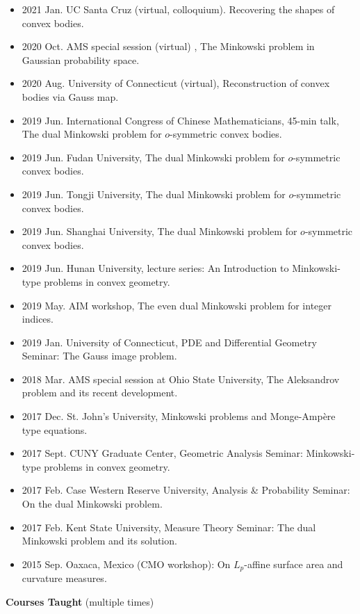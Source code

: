 \documentclass[12pt]{article}
\theoremstyle{plain} \numberwithin{equation}{section}
\theoremstyle{definition}
\begin{document}
\begin{itemize}
\item 2021 Jan. UC Santa Cruz (virtual, colloquium). Recovering the shapes of convex bodies.
\item 2020 Oct.  AMS special session (virtual)
, The Minkowski problem in Gaussian probability space.
\item 2020 Aug. University of Connecticut (virtual), Reconstruction of convex bodies via Gauss map.
\item 2019 Jun. International Congress of Chinese Mathematicians, 45-min talk, The dual Minkowski problem for $o$-symmetric convex bodies.
\item 2019 Jun. Fudan University, The dual Minkowski problem for $o$-symmetric convex bodies.
\item 2019 Jun. Tongji University, The dual Minkowski problem for $o$-symmetric convex bodies.
\item 2019 Jun. Shanghai University, The dual Minkowski problem for $o$-symmetric convex bodies.
\item 2019 Jun. Hunan University, lecture series: An Introduction to Minkowski-type problems in convex geometry.
\item 2019 May. AIM workshop, The even dual  Minkowski problem for integer indices.
\item 2019 Jan. University of Connecticut, PDE and Differential Geometry Seminar: The Gauss image problem. 
\item 2018 Mar. AMS special session at Ohio State University, The Aleksandrov problem and its recent development.
\item 2017 Dec. St. John’s University, Minkowski problems and Monge-Amp\`{e}re type equations.
\item 2017 Sept. CUNY Graduate Center, Geometric Analysis Seminar: Minkowski-type problems in convex geometry.
\item 2017 Feb. Case Western Reserve University, Analysis \& Probability Seminar: On the dual Minkowski problem.
\item 2017 Feb. Kent State University, Measure Theory Seminar: The dual Minkowski problem and its solution.
\item 2015 Sep. Oaxaca, Mexico (CMO workshop): On {$L_p$}-affine surface area and curvature measures. 
\end{itemize}

{\large\textbf{Courses Taught }(multiple times)}
\end{document}
